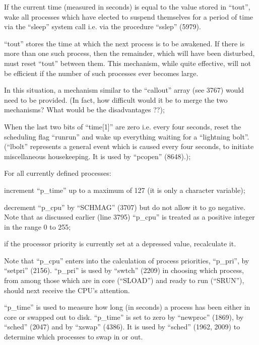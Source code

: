 \item[3804:] If the current time (measured in
 seconds) is equal to the value
 stored in ``tout'', wake all
 processes which have elected to
 suspend themselves for a period
 of time via the ``sleep'' system
 call i.e. via the procedure
 ``sslep'' (5979).
\ed

``tout'' stores the time at which the
next process is to be awakened. If
there is more than one such process,
then the remainder, which will have
been disturbed, must reset ``tout''
between them. This mechanism, while
quite effective, will not be efficient
if the number of such processes ever
becomes large.


In this situation, a mechanism similar
to the ``callout'' array (see 3767) would
need to be provided. (In fact, how difficult would it be to merge the two
mechanisms? What would be the disadvantages ??);

\bd
\item[3806:] When the last two bits of
 ``time[1]'' are zero i.e. every
 four seconds, reset the scheduling flag ``runrun'' and wake up
 everything waiting for a ``lightning bolt''. (``lbolt'' represents a
 general event which is caused
 every four seconds, to initiate
 miscellaneous housekeeping. It is
 used by ``pcopen'' (8648).);

\item[3810:] For all currently defined
 processes:

increment ``p\_time'' up to a maximum
of 127 (it is only a character
variable);

decrement ``p\_cpu'' by ``SCHMAG''
(3707) but do not allow it to go
negative. Note that as discussed
earlier (line 3795) ``p\_cpu'' is
treated as a positive integer in
the range 0 to 255;

if the processor priority is currently set
at a depressed value, recalculate it.
\ed


Note that ``p\_cpu'' enters into the calculation of process priorities,
``p\_pri'', by ``setpri'' (2156). ``p\_pri''
is used by ``swtch'' (2209) in choosing
which process, from among those which
are in core (``SLOAD'') and ready to run
(``SRUN''), should next receive the CPU's
attention.

``p\_time'' is used to measure how long
(in seconds) a process has been either
in core or swapped out to disk.
``p\_time'' is set to zero by ``newproc''
(1869), by ``sched'' (2047) and by
``xswap'' (4386). It is used by ``sched''
(1962, 2009) to determine which
processes to swap in or out.

